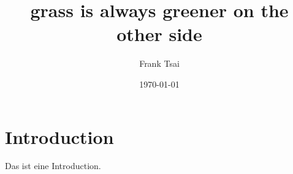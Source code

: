 \documentclass[article,10pt,oneside]{memoir}
\title{grass is always greener on the other side}
\author{Frank Tsai}
\date{\today}
\begin{document}
\maketitle
\tableofcontents

\section{Introduction}
\label{sec:introduction}

Das ist eine Introduction.



\end{document}
